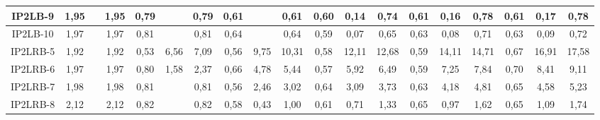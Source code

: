 \begin{table}[h]
{\begin{tabular}{c|c|c|c|c|c|c|c|c|c|c|c|c|c|c|c|c|c|c|}
\multicolumn{1}{|c|}{IP2LB-9} & {\color[HTML]{656565} 1,95} & {\color[HTML]{656565} } & 1,95 & {\color[HTML]{656565} 0,79} & {\color[HTML]{656565} } & 0,79 & {\color[HTML]{656565} 0,61} & {\color[HTML]{656565} } & 0,61 & {\color[HTML]{656565} 0,60} & {\color[HTML]{656565} 0,14} & 0,74 & {\color[HTML]{656565} 0,61} & {\color[HTML]{656565} 0,16} & 0,78 & {\color[HTML]{656565} 0,61} & {\color[HTML]{656565} 0,17} & 0,78 \\ \hline
\multicolumn{1}{|c|}{IP2LB-10} & {\color[HTML]{656565} 1,97} & {\color[HTML]{656565} } & 1,97 & {\color[HTML]{656565} 0,81} & {\color[HTML]{656565} } & 0,81 & {\color[HTML]{656565} 0,64} & {\color[HTML]{656565} } & 0,64 & {\color[HTML]{656565} 0,59} & {\color[HTML]{656565} 0,07} & 0,65 & {\color[HTML]{656565} 0,63} & {\color[HTML]{656565} 0,08} & 0,71 & {\color[HTML]{656565} 0,63} & {\color[HTML]{656565} 0,09} & 0,72 \\ \hline
\multicolumn{1}{|c|}{IP2LRB-5} & {\color[HTML]{656565} 1,92} & {\color[HTML]{656565} } & 1,92 & {\color[HTML]{656565} 0,53} & {\color[HTML]{656565} 6,56} & 7,09 & {\color[HTML]{656565} 0,56} & {\color[HTML]{656565} 9,75} & 10,31 & {\color[HTML]{656565} 0,58} & {\color[HTML]{656565} 12,11} & 12,68 & {\color[HTML]{656565} 0,59} & {\color[HTML]{656565} 14,11} & 14,71 & {\color[HTML]{656565} 0,67} & {\color[HTML]{656565} 16,91} & 17,58 \\ \hline
\multicolumn{1}{|c|}{IP2LRB-6} & {\color[HTML]{656565} 1,97} & {\color[HTML]{656565} } & 1,97 & {\color[HTML]{656565} 0,80} & {\color[HTML]{656565} 1,58} & 2,37 & {\color[HTML]{656565} 0,66} & {\color[HTML]{656565} 4,78} & 5,44 & {\color[HTML]{656565} 0,57} & {\color[HTML]{656565} 5,92} & 6,49 & {\color[HTML]{656565} 0,59} & {\color[HTML]{656565} 7,25} & 7,84 & {\color[HTML]{656565} 0,70} & {\color[HTML]{656565} 8,41} & 9,11 \\ \hline
\multicolumn{1}{|c|}{IP2LRB-7} & {\color[HTML]{656565} 1,98} & {\color[HTML]{656565} } & 1,98 & {\color[HTML]{656565} 0,81} & {\color[HTML]{656565} } & 0,81 & {\color[HTML]{656565} 0,56} & {\color[HTML]{656565} 2,46} & 3,02 & {\color[HTML]{656565} 0,64} & {\color[HTML]{656565} 3,09} & 3,73 & {\color[HTML]{656565} 0,63} & {\color[HTML]{656565} 4,18} & 4,81 & {\color[HTML]{656565} 0,65} & {\color[HTML]{656565} 4,58} & 5,23 \\ \hline
\multicolumn{1}{|c|}{IP2LRB-8} & {\color[HTML]{656565} 2,12} & {\color[HTML]{656565} } & 2,12 & {\color[HTML]{656565} 0,82} & {\color[HTML]{656565} } & 0,82 & {\color[HTML]{656565} 0,58} & {\color[HTML]{656565} 0,43} & 1,00 & {\color[HTML]{656565} 0,61} & {\color[HTML]{656565} 0,71} & 1,33 & {\color[HTML]{656565} 0,65} & {\color[HTML]{656565} 0,97} & 1,62 & {\color[HTML]{656565} 0,65} & {\color[HTML]{656565} 1,09} & 1,74 \\ \hline

\end{tabular}}
\end{table}
